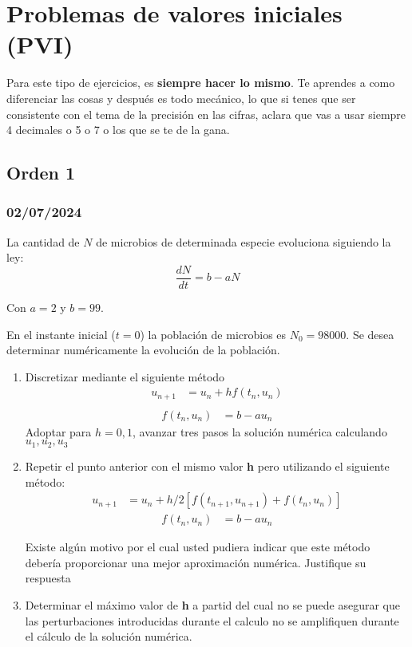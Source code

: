 \section{Problemas de valores iniciales (PVI)}

Para este tipo de ejercicios, es \textbf{siempre hacer lo mismo}. Te aprendes a como diferenciar las cosas y después es todo mecánico, lo que si tenes que ser consistente con el tema de la precisión en las cifras, aclara que vas a usar siempre 4 decimales o 5 o 7 o los que se te de la gana.

\subsection{Orden 1}

\subsubsection{02/07/2024}
La cantidad de $N$ de microbios de determinada especie evoluciona siguiendo la ley: 
$$\frac{dN}{dt} = b - aN$$

Con $a = 2$ y $b = 99$. 

En el instante inicial ($t=0$) la población de microbios es $N_0 = 98000$. Se desea determinar numéricamente la evolución de la población.

\begin{enumerate}
    \item {Discretizar mediante el siguiente método 
        \begin{equation*}
\begin{aligned}
u_{n+1} &= u_n + h f(t_n, u_n) \\
\end{aligned}
\end{equation*}
\begin{align*}
f(t_n, u_n) &= b - a u_n
\end{align*}
Adoptar para $h = 0,1$, avanzar tres pasos la solución numérica calculando $u_1, u_2, u_3$
    }

    \item { Repetir el punto anterior con el mismo valor \textbf{h} pero utilizando el siguiente método:
    \begin{equation*}
\begin{aligned}
u_{n+1} &= u_n + h/2 [f(t_{n+1}, u_{n+1}) +f(t_{n}, u_{n}) ]
\end{aligned}
\end{equation*}
\begin{align*}
f(t_n, u_n) &= b - a u_n
\end{align*}

Existe algún motivo por el cual usted pudiera indicar que este método debería proporcionar una mejor aproximación numérica. Justifique su respuesta
    }

    \item {Determinar el máximo valor de \textbf{h} a partid del cual no se puede asegurar que las perturbaciones introducidas durante el calculo no se amplifiquen durante el cálculo de la solución numérica.}
\end{enumerate}

